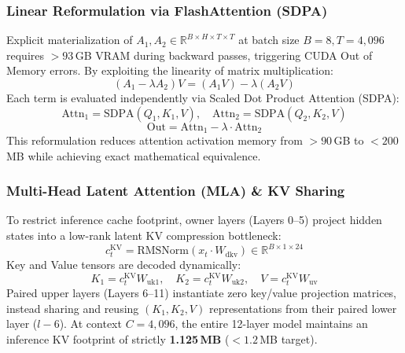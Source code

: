 \documentclass[10pt,twocolumn,letterpaper]{article}
\begin{document}
\subsubsection{Linear Reformulation via FlashAttention (SDPA)}
Explicit materialization of $A_1, A_2 \in \mathbb{R}^{B \times H \times T \times T}$ at batch size $B=8, T=4,096$ requires $>93$\,GB VRAM during backward passes, triggering CUDA Out of Memory errors. By exploiting the linearity of matrix multiplication:
\begin{equation}
    (A_1 - \lambda A_2) V = (A_1 V) - \lambda (A_2 V)
\end{equation}
Each term is evaluated independently via Scaled Dot Product Attention (SDPA):
\begin{equation}
    \text{Attn}_1 = \text{SDPA}(Q_1, K_1, V), \quad \text{Attn}_2 = \text{SDPA}(Q_2, K_2, V)
\end{equation}
\begin{equation}
    \text{Out} = \text{Attn}_1 - \lambda \cdot \text{Attn}_2
\end{equation}
This reformulation reduces attention activation memory from $>90$\,GB to $<200$\,MB while achieving exact mathematical equivalence.

\subsubsection{Multi-Head Latent Attention (MLA) \& KV Sharing}
To restrict inference cache footprint, owner layers (Layers 0--5) project hidden states into a low-rank latent KV compression bottleneck:
\begin{equation}
    c_t^{\text{KV}} = \text{RMSNorm}(x_t \cdot W_{\text{dkv}}) \in \mathbb{R}^{B \times 1 \times 24}
\end{equation}
Key and Value tensors are decoded dynamically:
\begin{equation}
    K_1 = c_t^{\text{KV}} W_{\text{uk1}}, \quad K_2 = c_t^{\text{KV}} W_{\text{uk2}}, \quad V = c_t^{\text{KV}} W_{\text{uv}}
\end{equation}
Paired upper layers (Layers 6--11) instantiate zero key/value projection matrices, instead sharing and reusing $(K_1, K_2, V)$ representations from their paired lower layer ($l - 6$). At context $C = 4,096$, the entire 12-layer model maintains an inference KV footprint of strictly \textbf{1.125\,MB} ($< 1.2$\,MB target).
\end{document}
